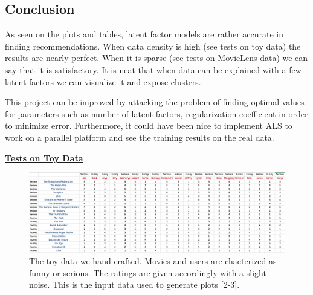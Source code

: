 \documentclass[11pt]{article}
\begin{document}
\begin{multicols}{2}
	\section{Conclusion}
	As seen on the plots and tables, latent factor models are rather accurate in finding recommendations. When data density is high (see tests on toy data) the results are nearly perfect. When it is sparse (see tests on MovieLens data) we can say that it is satisfactory. It is neat that when data can be explained with a few latent factors we can visualize it and expose clusters.
	
	This project can be improved by attacking the problem of finding optimal values for parameters such as number of latent factors, regularization coefficient in order to minimize error. Furthermore, it could have been nice to implement ALS to work on a parallel platform and see the training results on the real data.
	
	

	
	
\end{multicols}
\vspace{15mm}

	\def \wi {0.75\columnwidth}
	
	\def \wiq {0.70\columnwidth}	
	\begin{center}
		\Large \textbf{\underline{Tests on Toy Data}}
	\end{center}

	
	\begin{figure}[H]
		\centering		
		\includegraphics[width=\columnwidth]{buff1/data}
		\caption{The toy data we hand crafted. Movies and users are chacterized as funny or serious. The ratings are given accordingly with a slight noise. This is the input data used to generate plots [2-3].}
		\label{1}		
	\end{figure}
				
%	
	
\end{document}
